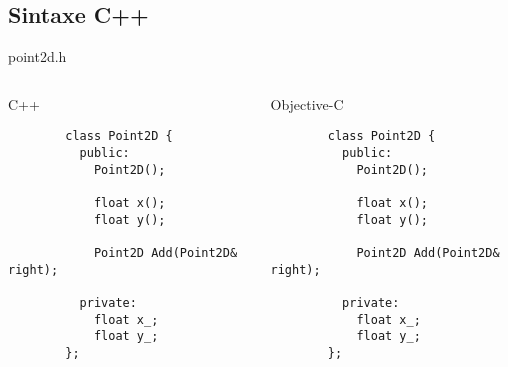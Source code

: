 \documentclass[brazil]{beamer}
\begin{document}
\subsection{Sintaxe C++}

\begin{frame}[fragile]
  point2d.h
  \begin{columns}
    \begin{column}{.5\textwidth}
      \begin{center}
        C++
      \end{center}
      \lstset{language=C++,basicstyle=\tiny}
      \begin{lstlisting}
        class Point2D {
          public:
            Point2D();

            float x();
            float y();

            Point2D Add(Point2D& right);

          private:
            float x_;
            float y_;
        };
      \end{lstlisting}
    \end{column}
    \begin{column}{.5\textwidth}
      \begin{center}
        Objective-C
      \end{center}
      \lstset{language=C++,basicstyle=\tiny}
      \begin{lstlisting}
        class Point2D {
          public:
            Point2D();

            float x();
            float y();

            Point2D Add(Point2D& right);

          private:
            float x_;
            float y_;
        };
      \end{lstlisting}
    \end{column}
  \end{columns}
\end{frame}
\end{document}
